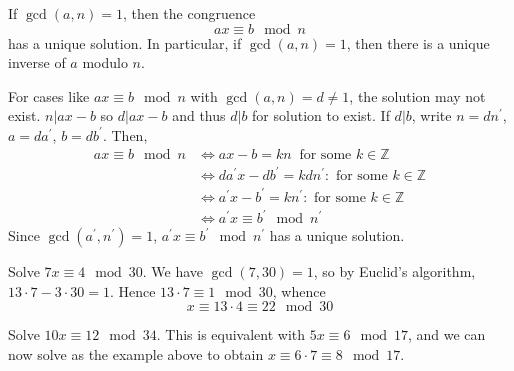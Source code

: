 \documentclass[10pt, a4paper, twoside]{report}
\begin{document}
\begin{corollary}
    If \(\gcd(a,n)=1\), then the congruence
    \[ax\equiv b\mod n\]
    has a unique solution. In particular, if \(\gcd(a,n)=1\), then there is a unique inverse of \(a\) modulo \(n\).
\end{corollary}
For cases like \(ax\equiv b\mod n\) with \(\gcd(a,n)=d\neq 1\), the solution may not exist. \(n|ax-b\) so \(d|ax-b\) and thus \(d|b\) for solution to exist. If \(d|b\), write \(n=dn^\prime\), \(a=da^\prime\), \(b=db^\prime\). Then,
\begin{align*}
    ax\equiv b\mod n&\Leftrightarrow ax-b=kn\:\text{ for some \(k\in\mathbb{Z}\)} \\
    &\Leftrightarrow da^\prime x-db^\prime=kdn^\prime:\text{ for some \(k\in\mathbb{Z}\)} \\
    &\Leftrightarrow a^\prime x-b^\prime=kn^\prime :\text{ for some \(k\in\mathbb{Z}\)} \\
    &\Leftrightarrow a^\prime x\equiv b^\prime\mod n^\prime
\end{align*}
Since \(\gcd(a^\prime,n^\prime)=1\), \(a^\prime x\equiv b^\prime\mod n^\prime\) has a unique solution.
\begin{example}
    Solve \(7x\equiv 4\mod 30\).\newline 
    We have \(\gcd(7,30)=1\), so by Euclid's algorithm, \(13\cdot 7-3\cdot 30=1\). Hence \(13\cdot 7\equiv 1\mod 30\), whence 
    \[x\equiv 13\cdot 4\equiv 22\mod 30\]
\end{example}
\begin{example}
    Solve \(10x\equiv 12\mod 34\). \newline 
    This is equivalent with \(5x\equiv 6\mod 17\), and we can now solve as the example above to obtain \(x\equiv 6\cdot 7\equiv 8\mod 17\).
\end{example}
\end{document}
